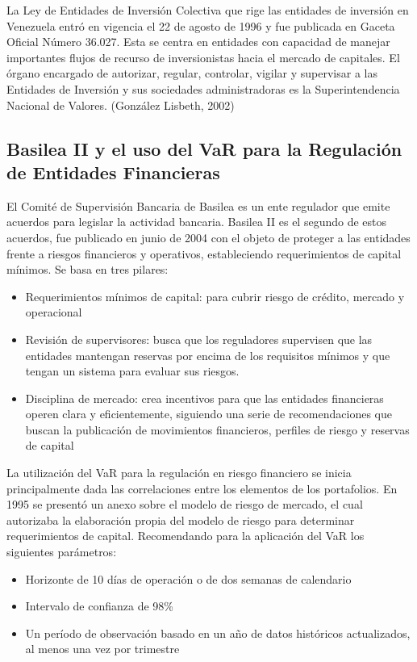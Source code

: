 \documentclass[a4paper,12pt]{Latex/Classes/PhDthesisPSnPDF}
\begin{document}
La Ley de Entidades de Inversión Colectiva que rige las entidades de inversión en Venezuela entró en vigencia el 22 de agosto de 1996 y fue publicada en Gaceta Oficial Número 36.027. Esta se centra en entidades con capacidad de manejar importantes flujos de recurso de inversionistas hacia el mercado de capitales. El órgano encargado de autorizar, regular, controlar, vigilar y supervisar a las Entidades de Inversión y sus sociedades administradoras es la Superintendencia Nacional de Valores. (González Lisbeth, 2002)

\subsection{Basilea II y el uso del VaR para la Regulación de Entidades Financieras}

El Comité de Supervisión Bancaria de Basilea es un ente regulador que emite acuerdos para legislar la actividad bancaria. Basilea II es el segundo de estos acuerdos, fue publicado en junio de 2004 con el objeto de proteger a las entidades frente a riesgos financieros y operativos, estableciendo requerimientos de capital mínimos. Se basa en tres pilares:

\begin{itemize}
\item Requerimientos mínimos de capital: para cubrir riesgo de crédito, mercado y operacional
\item Revisión de supervisores: busca que los reguladores supervisen que las entidades mantengan reservas por encima de los requisitos mínimos y que tengan un sistema para evaluar sus riesgos.
\item Disciplina de mercado: crea incentivos para que las entidades financieras operen clara y eficientemente, siguiendo una serie de recomendaciones que buscan la publicación de movimientos financieros, perfiles de riesgo y reservas de capital
\end{itemize}

La utilización del VaR para la regulación en riesgo financiero se inicia principalmente dada las correlaciones entre los elementos de los portafolios. En 1995 se presentó un anexo sobre el modelo de riesgo de mercado, el cual autorizaba la elaboración propia del modelo de riesgo para determinar requerimientos de capital. Recomendando para la aplicación del VaR los siguientes parámetros:

\begin{itemize}
\item Horizonte de 10 días de operación o de dos semanas de calendario
\item Intervalo de confianza de 98\%
\item Un período de observación basado en un año de datos históricos actualizados, al menos una vez por trimestre
\end{itemize}
\end{document}
